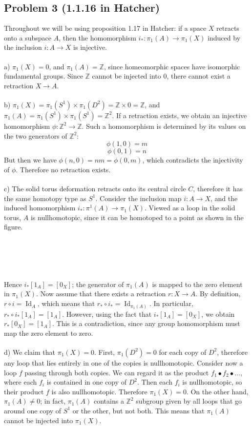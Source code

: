\documentclass[12 pt]{article}
\newcommand{\Z}{\mathbb{Z}}
\DeclareMathOperator{\id}{Id}
\begin{document}
\subsection*{Problem 3 (1.1.16 in Hatcher)}
Throughout we will be using proposition 1.17 in Hatcher: if a space $X$ retracts onto a subspace $A$, then the homomorphism $i_* : \pi_1 (A) \to \pi_1(X)$ induced by the inclusion $i: A \to X$ is injective.
\\
\\
a) $\pi_1(X) = 0$, and $\pi_1(A) = \Z$, since homeomorphic spaces have isomorphic fundamental groups. Since $\Z$ cannot be injected into $0$, there cannot exist a retraction $X \to A$.
\\
\\
b) $\pi_1(X) = \pi_1(S^1) \times \pi_1(D^2) = \Z \times 0 = \Z$, and $\pi_1(A) = \pi_1(S^1) \times \pi_1(S^1) = \Z^2$. If a retraction exists, we obtain an injective homomorphism $\phi:\Z^2 \to \Z$. Such a homomorphism is determined by its values on the two generators of $\Z^2$:
\[           \phi(1,0) = m       \]
\[      \phi(0,1) = n     \]
But then we have $\phi(n,0) = nm = \phi(0,m)$, which contradicts the injectivity of $\phi$. Therefore no retraction exists.
\\
\\
c) The solid torus deformation retracts onto its central circle $C$, therefore it has the same homotopy type as $S^1$. Consider the inclusion map $i:A \to X$, and the induced homomorphism $i_* : \pi^1(A) \to \pi_1(X)$. Viewed as a loop in the solid torus, $A$ is nullhomotopic, since it can be homotoped to a point as shown in the figure.
\\
\\
\\
\\
\\
\\
Hence $i_* [1_A] = [0_X]$; the generator of $\pi_1(A)$ is mapped to the zero element in $\pi_1(X)$. Now assume that there exists a retraction $r:X \to A$. By definition, $r\circ i = \id_A$, which means that $r_* \circ i_* = \id_{\pi_1(A)}$. In particular, $r_* \circ i_* [1_A] = [1_A]$. However, using the fact that $i_* [1_A] =  [0_X]$, we obtain $r_*[0_X] = [1_A]$. This is a contradiction, since any group homomorphism must map the zero element to zero.
\\
\\
d) We claim that $\pi_1(X) = 0$. First, $\pi_1(D^2) = 0$ for each copy of $D^2$, therefore any loop that lies entirely in one of the copies is nullhomotopic. Consider now a loop $f$ passing through both copies. We can regard it as the product $f_1 \bullet f_2 \bullet \dots$, where each $f_i$ is contained in one copy of $D^2$. Then each $f_i$ is nullhomotopic, so their product $f$ is also nullhomotopic. Therefore $\pi_1(X) = 0$. On the other hand,$\pi_1(A) \neq 0$; in fact, $\pi_1(A)$ contains a $\Z^2$ subgroup given by all loops that go around one copy of $S^1$ or the other, but not both. This means that $\pi_1(A)$ cannot be injected into $\pi_1(X)$.
\end{document}
